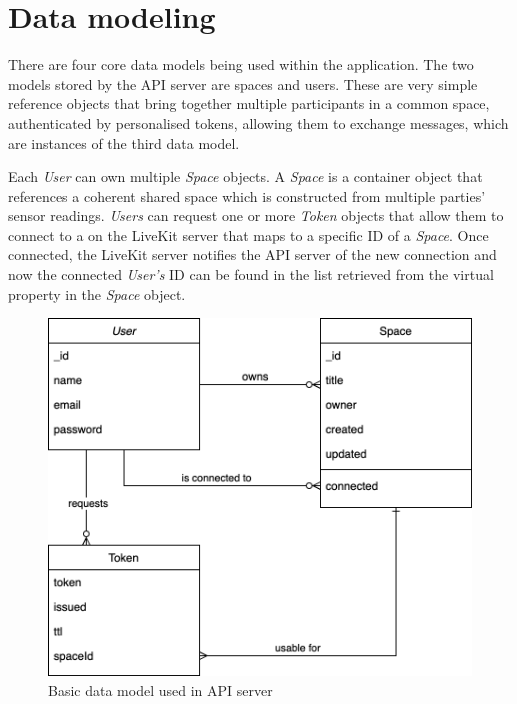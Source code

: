 \section{Data modeling}
\label{sec:datamodeling}

There are four core data models being used within the application.
The two models stored by the \ac{API} server are spaces and users.
These are very simple reference objects that bring together multiple participants in a common space, authenticated by personalised tokens, allowing them to exchange messages, which are instances of the third data model.

Each \emph{User} can own multiple \emph{Space} objects.
A \emph{Space} is a container object that references a coherent shared space which is constructed from multiple parties' sensor readings. \emph{Users} can request one or more \emph{Token} objects that allow them to connect to a  on the LiveKit server that maps to a specific ID of a \emph{Space}.
Once connected, the LiveKit server notifies the \ac{API} server of the new connection and now the connected \emph{User's} ID can be found in the list retrieved from the virtual  property in the \emph{Space} object.

\begin{figure}[h]
\centering
\includegraphics[scale=0.4]{04_Artefakte/01_Abbildungen/api-datamodel}
\caption[API data model]{Basic data model used in API server\protect}
\label{fig:apiDataModel}
\end{figure}

